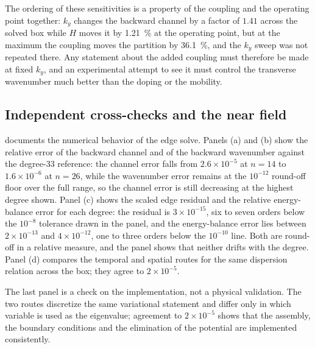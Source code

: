 The ordering of these sensitivities is a property of the coupling and the operating point together: $k_y$ changes the backward channel by a factor of $1.41$ across the solved box while $H$ moves it by \SI{1.21}{\percent} at the operating point, but at the maximum the coupling moves the partition by \SI{36.1}{\percent}, and the $k_y$ sweep was not repeated there.  Any statement about the added coupling must therefore be made at fixed $k_y$, and an experimental attempt to see it must control the transverse wavenumber much better than the doping or the mobility.

\subsection{Independent cross-checks and the near field}
\label{sec:results_validation}
\label{sec:results_field}

 documents the numerical behavior of the edge solve.  Panels
(a) and (b) show the relative error of the backward channel and of the backward
wavenumber against the degree-33 reference: the channel error falls from
$2.6\times10^{-5}$ at $n=14$ to $1.6\times10^{-6}$ at $n=26$, while the wavenumber error remains at the $10^{-12}$ round-off floor over the full range, so the channel
error is still decreasing at the highest degree shown.  Panel (c)
shows the scaled edge residual and the relative energy-balance error for each degree: the residual is $3\times10^{-15}$, six to seven orders below the
$10^{-8}$ tolerance drawn in the panel, and the energy-balance error lies between $2\times10^{-13}$ and $4\times10^{-12}$, one to three orders below the
$10^{-10}$ line.  Both are round-off in a relative measure, and the panel
shows that neither drifts with the degree.  Panel (d) compares the temporal and spatial routes for the same
dispersion relation across the box; they agree to $2\times10^{-5}$.

The last panel is a check on the implementation, not a physical validation.  The
two routes discretize the same variational statement and differ only in which
variable is used as the eigenvalue; agreement to $2\times10^{-5}$ shows that the
assembly, the boundary conditions and the elimination of the potential are
implemented consistently.

